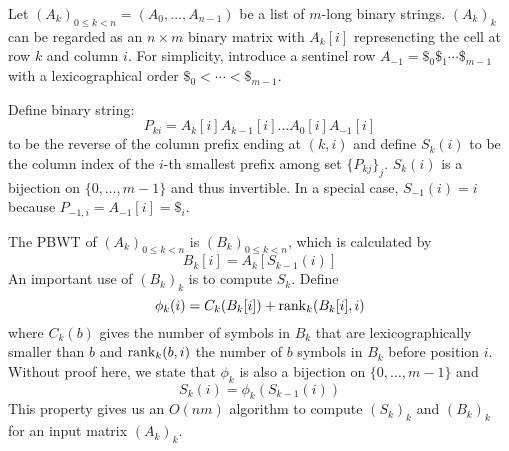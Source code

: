 \documentclass{article}[10pt]
\begin{document}
Let $(A_k)_{0\le k<n}=(A_0,\ldots,A_{n-1})$ be a list of $m$-long binary
strings. $(A_k)_k$ can be regarded as an $n\times m$ binary matrix with
$A_k[i]$ represencting the cell at row $k$ and column $i$.  For simplicity,
introduce a sentinel row $A_{-1}=\$_0\$_1\cdots\$_{m-1}$ with a lexicographical
order $\$_0<\cdots<\$_{m-1}$.

Define binary string:
\[
P_{ki}=A_k[i]A_{k-1}[i]\ldots A_0[i]A_{-1}[i]
\]
to be the reverse of the column prefix ending at $(k,i)$ and define $S_k(i)$ to
be the column index of the $i$-th smallest prefix among set $\{P_{kj}\}_j$.
$S_k(i)$ is a bijection on $\{0,\ldots,m-1\}$ and thus invertible. In a
special case, $S_{-1}(i)=i$ because $P_{-1,i}=A_{-1}[i]=\$_i$.

The PBWT of $(A_k)_{0\le k<n}$ is $(B_k)_{0\le k<n}$, which is
calculated by
\begin{equation}\label{eq:B}
B_k[i]=A_k[S_{k-1}(i)]
\end{equation}
An important use of $(B_k)_k$ is to compute $S_k$. Define
\begin{equation}\label{eq:phi}
\phi_k(i)=C_k(B_k[i])+{\rm rank}_k(B_k[i],i)
\end{equation}
where $C_k(b)$ gives the number of symbols in $B_k$ that are lexicographically
smaller than $b$ and ${\rm rank}_k(b,i)$ the number of $b$ symbols in $B_k$
before position $i$. Without proof here, we state that $\phi_k$ is also a
bijection on $\{0,\ldots,m-1\}$ and
\begin{equation}\label{eq:trans}
S_k(i)=\phi_k(S_{k-1}(i))
\end{equation}
This property gives us an $O(nm)$ algorithm to compute $(S_k)_k$ and $(B_k)_k$
for an input matrix $(A_k)_k$.
\end{document}
